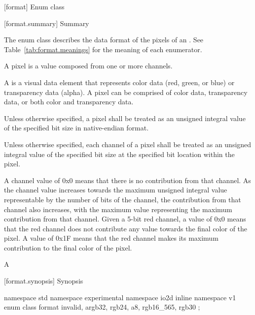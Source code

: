  [format] {Enum class }

 [format.summary] { Summary}

\pnum
The  enum class describes the data format of the pixels of an 
. See Table~\ref{tab:format.meanings} for 
the meaning of each  enumerator.

\pnum
A pixel is a value composed from one or more channels.

\pnum
A  is a visual data element that represents color data (red, green,
or blue) or transparency data (alpha). A pixel can be comprised of color data,
transparency data, or both color and transparency data.

\pnum
Unless otherwise specified, a pixel shall be treated as an unsigned integral
value of the specified bit size in native-endian format.

\pnum
Unless otherwise specified, each channel of a pixel shall be treated as an 
unsigned integral value of the specified bit size at the specified bit location
within the pixel.

\pnum
A channel value of 0x0 means that there is no contribution from that channel. 
As the channel value increases towards the maximum unsigned integral value 
representable by the number of bits of the channel, the contribution from that 
channel also increases, with the maximum value representing the maximum
contribution from that channel.
\enterexample
Given a 5-bit red channel, a value of 0x0 means that the red channel does not 
contribute any value towards the final color of the pixel. A value of 0x1F 
means that the red channel makes its maximum contribution to the final color of 
the pixel.

A
\exitexample

 [format.synopsis] { Synopsis}

\begin{codeblock}
namespace std { namespace experimental { namespace io2d { inline namespace v1 {
  enum class format {
    invalid,
    argb32,
    rgb24,
    a8,
    rgb16_565,
    rgb30
  };
} } } }
\end{codeblock}

